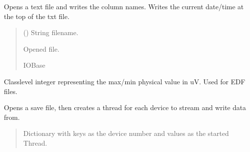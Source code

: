 \documentclass[letterpaper,10pt,english]{sphinxmanual}
\begin{document}
\begin{fulllineitems}
\begin{fulllineitems}
\label{\detokenize{Setup_8206HR:Setup_8206HR.Setup_8206HR._OpenSaveFile_TXT}}
\pysigstartsignatures
{}
\pysigstopsignatures
\sphinxAtStartPar
Opens a text file and writes the column names. Writes the current date/time at the top of         the txt file.
\begin{quote}\begin{description}
\sphinxAtStartPar
{} () \textendash{} String filename.

\sphinxAtStartPar
Opened file.

\sphinxAtStartPar
IOBase

\end{description}\end{quote}

\end{fulllineitems}


\begin{fulllineitems}
\label{\detokenize{Setup_8206HR:Setup_8206HR.Setup_8206HR._PHYSICAL_BOUND_uV}}
\pysigstartsignatures
{}
\pysigstopsignatures
\sphinxAtStartPar
Class\sphinxhyphen{}level integer representing the max/\sphinxhyphen{}min physical value in uV.     Used for EDF files.

\end{fulllineitems}


\begin{fulllineitems}
\label{\detokenize{Setup_8206HR:Setup_8206HR.Setup_8206HR._StreamThreading}}
\pysigstartsignatures
{}
\pysigstopsignatures
\sphinxAtStartPar
Opens a save file, then creates a thread for each device to stream and write data from.
\begin{quote}\begin{description}
\sphinxAtStartPar
Dictionary with keys as the device number and values as the started Thread.


\end{description}
\end{quote}
\end{fulllineitems}
\end{fulllineitems}
\end{document}
